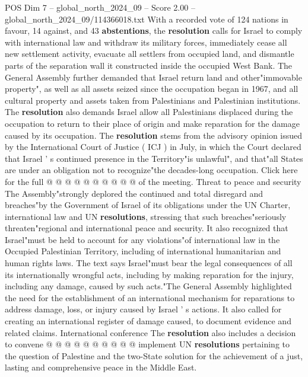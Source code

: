 \begin{textsample}{POS Dim 7 – global\_north\_2024\_09 – Score 2.00 – global\_north\_2024\_09/114366018.txt}  \label{ex:f7_pos_431}
With a recorded vote of 124 nations in favour, 14 against, and 43 \textbf{abstentions}, the \textbf{resolution} calls for Israel to comply with international law and withdraw its military forces, immediately cease all new settlement activity, evacuate all settlers from occupied land, and dismantle parts of the separation wall it constructed inside the occupied West Bank.
The General Assembly further demanded that Israel return land and other"immovable property", as well as all assets seized since the occupation began in 1967, and all cultural property and assets taken from Palestinians and Palestinian institutions.
The \textbf{resolution} also demands Israel allow all Palestinians displaced during the occupation to return to their place of origin and make reparation for the damage caused by its occupation.
The \textbf{resolution} stems from the advisory opinion issued by the International Court of Justice ( ICJ ) in July, in which the Court declared that Israel ' s continued presence in the Territory"is unlawful", and that"all States are under an obligation not to recognize"the decades-long occupation.
Click here for the full @ @ @ @ @ @ @ @ @ @ of the meeting.
Threat to peace and security The Assembly"strongly deplored the continued and total disregard and breaches"by the Government of Israel of its obligations under the UN Charter, international law and UN \textbf{resolutions}, stressing that such breaches"seriously threaten"regional and international peace and security.
It also recognized that Israel"must be held to account for any violations"of international law in the Occupied Palestinian Territory, including of international humanitarian and human rights laws.
The text says Israel"must bear the legal consequences of all its internationally wrongful acts, including by making reparation for the injury, including any damage, caused by such acts."The General Assembly highlighted the need for the establishment of an international mechanism for reparations to address damage, loss, or injury caused by Israel ' s actions.
It also called for creating an international register of damage caused, to document evidence and related claims.
International conference The \textbf{resolution} also includes a decision to convene @ @ @ @ @ @ @ @ @ @ implement UN \textbf{resolutions} pertaining to the question of Palestine and the two-State solution for the achievement of a just, lasting and comprehensive peace in the Middle East.

\end{textsample}
